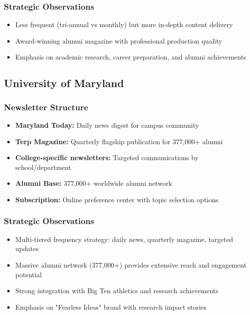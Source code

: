 \documentclass[12pt,letterpaper]{article}
\begin{document}
\subsubsection{Strategic Observations}
\begin{itemize}[leftmargin=*]
    \item Less frequent (tri-annual vs monthly) but more in-depth content delivery
    \item Award-winning alumni magazine with professional production quality
    \item Emphasis on academic research, career preparation, and alumni achievements
\end{itemize}

\subsection{University of Maryland}

\subsubsection{Newsletter Structure}
\begin{itemize}[leftmargin=*]
    \item \textbf{Maryland Today:} Daily news digest for campus community
    \item \textbf{Terp Magazine:} Quarterly flagship publication for 377,000+ alumni
    \item \textbf{College-specific newsletters:} Targeted communications by school/department
    \item \textbf{Alumni Base:} 377,000+ worldwide alumni network
    \item \textbf{Subscription:} Online preference center with topic selection options
\end{itemize}

\subsubsection{Strategic Observations}
\begin{itemize}[leftmargin=*]
    \item Multi-tiered frequency strategy: daily news, quarterly magazine, targeted updates
    \item Massive alumni network (377,000+) provides extensive reach and engagement potential
    \item Strong integration with Big Ten athletics and research achievements
    \item Emphasis on "Fearless Ideas" brand with research impact stories
\end{itemize}
\end{document}
